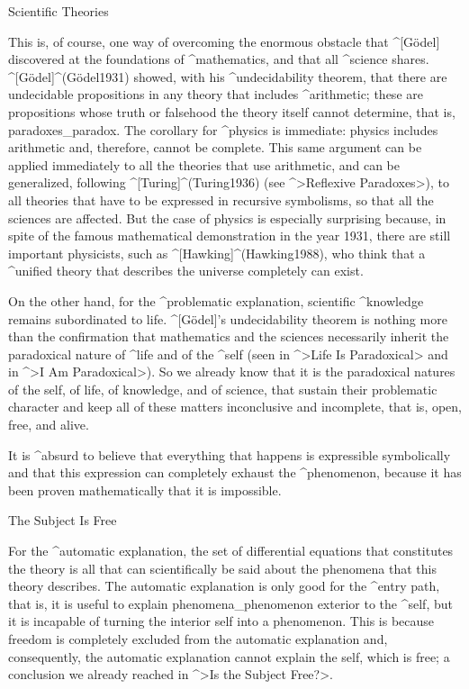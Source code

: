 \Section Scientific Theories

This is, of course, one way of overcoming the enormous obstacle that
^[Gödel] discovered at the foundations of ^{mathematics}, and that all
^{science} shares.
%
^[Gödel]^(G\"odel1931) showed, with his ^{undecidability} theorem, that
there are undecidable propositions in any theory that includes
^{arithmetic}; these are propositions whose truth or falsehood the
theory itself cannot determine, that is, paradoxes_{paradox}. The
corollary for ^{physics} is immediate: physics includes arithmetic and,
therefore, cannot be complete. This same argument can be applied
immediately to all the theories that use arithmetic, and can be
generalized, following ^[Turing]^(Turing1936) (see ^>Reflexive
Paradoxes>), to all theories that have to be expressed in recursive
symbolisms, so that all the sciences are affected. But the case of
physics is especially surprising because, in spite of the famous
mathematical demonstration in the year 1931, there are still important
physicists, such as ^[Hawking]^(Hawking1988), who think that a ^{unified
theory} that describes the universe completely can exist.

On the other hand, for the ^{problematic explanation}, scientific
^{knowledge} remains subordinated to life. ^[Gödel]'s undecidability
theorem is nothing more than the confirmation that mathematics and the
sciences necessarily inherit the paradoxical nature of ^{life} and of
the ^{self} (seen in ^>Life Is Paradoxical> and in ^>I Am Paradoxical>).
So we already know that it is the paradoxical natures of the self, of
life, of knowledge, and of science, that sustain their problematic
character and keep all of these matters inconclusive and incomplete,
that is, open, free, and alive.

It is ^{absurd} to believe that everything that happens is expressible
symbolically and that this expression can completely exhaust the
^{phenomenon}, because it has been proven mathematically that it is
impossible.


\Section The Subject Is Free

For the ^{automatic explanation}, the set of differential equations that
constitutes the theory is all that can scientifically be said about the
phenomena that this theory describes. The automatic explanation is only
good for the ^{entry path}, that is, it is useful to explain
phenomena_{phenomenon}  exterior to the ^{self}, but it is incapable of
turning the interior self into a phenomenon. This is because freedom is
completely excluded from the automatic explanation and, consequently,
the automatic explanation cannot explain the self, which is free; a
conclusion we already reached in ^>Is the Subject Free?>.

